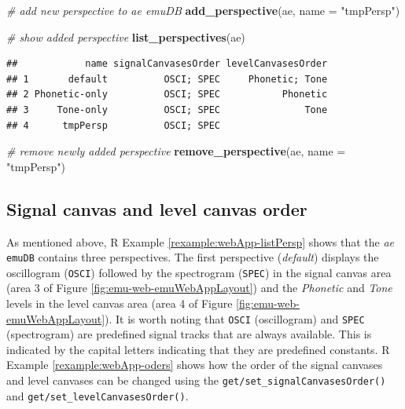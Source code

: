 \documentclass[]{book}
\newenvironment{Shaded}{\begin{snugshade}}{\end{snugshade}}
\newcommand{\CommentTok}[1]{\textcolor[rgb]{0.56,0.35,0.01}{\textit{#1}}}
\newcommand{\DataTypeTok}[1]{\textcolor[rgb]{0.13,0.29,0.53}{#1}}
\newcommand{\KeywordTok}[1]{\textcolor[rgb]{0.13,0.29,0.53}{\textbf{#1}}}
\newcommand{\NormalTok}[1]{#1}
\newcommand{\StringTok}[1]{\textcolor[rgb]{0.31,0.60,0.02}{#1}}
\theoremstyle{definition}
\theoremstyle{definition}
\theoremstyle{definition}
\theoremstyle{remark}
\begin{document}
\begin{Shaded}
\begin{Highlighting}[]
\CommentTok{# add new perspective to ae emuDB}
\KeywordTok{add_perspective}\NormalTok{(ae,}
                \DataTypeTok{name =} \StringTok{"tmpPersp"}\NormalTok{)}

\CommentTok{# show added perspective}
\KeywordTok{list_perspectives}\NormalTok{(ae)}
\end{Highlighting}
\end{Shaded}

\begin{verbatim}
##            name signalCanvasesOrder levelCanvasesOrder
## 1       default          OSCI; SPEC     Phonetic; Tone
## 2 Phonetic-only          OSCI; SPEC           Phonetic
## 3     Tone-only          OSCI; SPEC               Tone
## 4      tmpPersp          OSCI; SPEC
\end{verbatim}

\begin{Shaded}
\begin{Highlighting}[]
\CommentTok{# remove newly added perspective}
\KeywordTok{remove_perspective}\NormalTok{(ae,}
                   \DataTypeTok{name =} \StringTok{"tmpPersp"}\NormalTok{)}
\end{Highlighting}
\end{Shaded}

\hypertarget{signal-canvas-and-level-canvas-order}{%
\subsection{Signal canvas and level canvas
order}\label{signal-canvas-and-level-canvas-order}}

As mentioned above, R Example \ref{rexample:webApp-listPersp} shows that
the \emph{ae} \texttt{emuDB} contains three perspectives. The first
perspective (\emph{default}) displays the oscillogram (\texttt{OSCI})
followed by the spectrogram (\texttt{SPEC}) in the signal canvas area
(area 3 of Figure \ref{fig:emu-web-emuWebAppLayout}) and the
\emph{Phonetic} and \emph{Tone} levels in the level canvas area (area 4
of Figure \ref{fig:emu-web-emuWebAppLayout}). It is worth noting that
\texttt{OSCI} (oscillogram) and \texttt{SPEC} (spectrogram) are
predefined signal tracks that are always available. This is indicated by
the capital letters indicating that they are predefined constants. R
Example \ref{rexample:webApp-oders} shows how the order of the signal
canvases and level canvases can be changed using the
\texttt{get/set\_signalCanvasesOrder()} and
\texttt{get/set\_levelCanvasesOrder()}.
\end{document}

